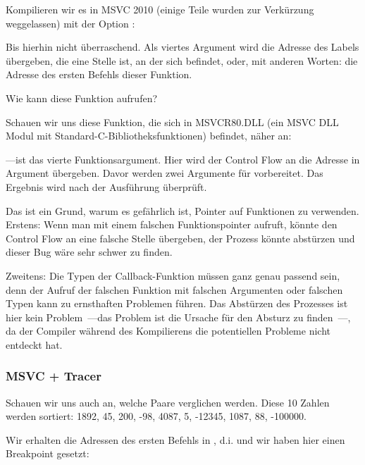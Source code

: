 Kompilieren wir es in MSVC 2010 (einige Teile wurden zur Verkürzung weggelassen) mit der Option \TT{\Ox}:


Bis hierhin nicht überraschend. 
Als viertes Argument wird die Adresse des Labels  übergeben, die eine Stelle ist, an der sich \comp befindet,
oder, mit anderen Worten: die Adresse des ersten Befehls dieser Funktion.

Wie kann \qsort diese Funktion aufrufen?

Schauen wir uns diese Funktion, die sich in MSVCR80.DLL (ein MSVC DLL Modul mit Standard-C-Bibliotheksfunktionen)
befindet, näher an:



---ist das vierte Funktionsargument.
Hier wird der Control Flow an die Adresse in  Argument übergeben.
Davor werden zwei Argumente für \comp vorbereitet. Das Ergebnis wird nach der Ausführung überprüft.

Das ist ein Grund, warum es gefährlich ist, Pointer auf Funktionen zu verwenden.
Erstens: Wenn man \qsort mit einem falschen Funktionspointer aufruft, könnte \qsort den Control Flow an eine falsche
Stelle übergeben, der Prozess könnte abstürzen und dieser Bug wäre sehr schwer zu finden.

Zweitens: Die Typen der Callback-Funktion müssen ganz genau passend sein, denn der Aufruf der falschen Funktion mit
falschen Argumenten oder falschen Typen kann zu ernsthaften Problemen führen. Das Abstürzen des Prozesses ist hier kein
Problem~---das Problem ist die Ursache für den Absturz zu finden~---, da der Compiler während des Kompilierens die
potentiellen Probleme nicht entdeckt hat.



\subsubsection{MSVC + Tracer}
Schauen wir uns auch an, welche Paare verglichen werden.
Diese 10 Zahlen werden sortiert: 
1892, 45, 200, -98, 4087, 5, -12345, 1087, 88, -100000.

Wir erhalten die Adressen des ersten \CMP Befehls in \comp, d.i.  und wir haben hier einen Breakpoint
gesetzt:

